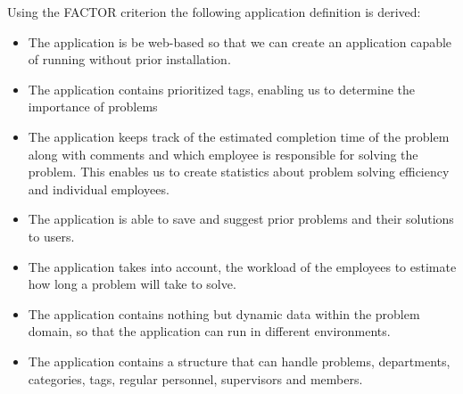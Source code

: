 Using the FACTOR criterion the following application definition is derived:
\begin{itemize}
\item The application is be web-based so that we can create an application capable of running without prior installation.
\item The application contains prioritized tags, enabling us to determine the importance of problems
\item The application keeps track of the estimated completion time of the problem along with comments and which employee is responsible for solving the problem.
This enables us to create statistics about problem solving efficiency and individual employees.
\item The application is able to save and suggest prior problems and their solutions to users.
\item The application takes into account, the workload of the employees to estimate how long a problem will take to solve.
\item The application contains nothing but dynamic data within the problem domain, so that the application can run in different environments.
\item The application contains a structure that can handle problems, departments, categories, tags, regular personnel, supervisors and \astaff[] members.
\end{itemize}

\begin{comment}
Using these FACTOR criteria, we arrive at the following application definition:
\begin{itemize}
\item The application is web-based so that we can create an application capable of running without prior installation.
\item The application should contain prioritized tags, enabling us to determine the importance of problems
\item The application should keep track of the estimated completion time of the problem along with comments and what employee is responsible for the problem. This will enable us to create statistic about problem solving efficiency and individual employees.
\item The application should be able to save and suggest prior problems and their solutions to users.
\item The application should take into account, the workload of the employees to estimate how long a problem will take to solve.
\item The application should should contain nothing but dynamic data within the problem domain, so that the application can run in different environments.
\item The application should contain a structure that can handle problems, departments, categories, tags, employees, supervisors and ordinary users.
\end{itemize}
\end{comment}


